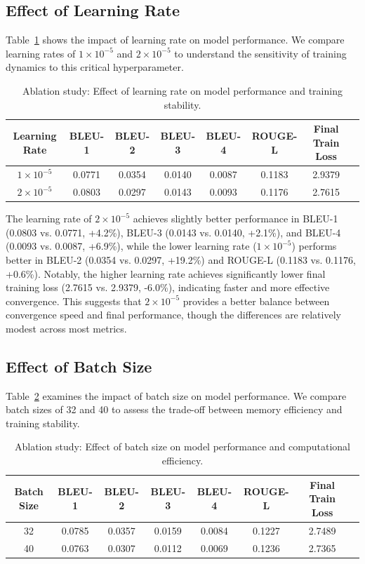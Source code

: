 \documentclass[runningheads]{llncs}
\begin{document}
\subsection{Effect of Learning Rate}

Table~\ref{tab:ablation_lr} shows the impact of learning rate on model performance. We compare learning rates of $1 \times 10^{-5}$ and $2 \times 10^{-5}$ to understand the sensitivity of training dynamics to this critical hyperparameter.

\begin{table}
\caption{Ablation study: Effect of learning rate on model performance and training stability.}\label{tab:ablation_lr}
\begin{tabular}{|c|c|c|c|c|c|c|c|}
\hline
Learning Rate & BLEU-1 & BLEU-2 & BLEU-3 & BLEU-4 & ROUGE-L & Final Train Loss\\
\hline
$1 \times 10^{-5}$ & 0.0771 & 0.0354 & 0.0140 & 0.0087 & 0.1183 & 2.9379\\
$2 \times 10^{-5}$ & 0.0803 & 0.0297 & 0.0143 & 0.0093 & 0.1176 & 2.7615\\
\hline
\end{tabular}
\end{table}

The learning rate of $2 \times 10^{-5}$ achieves slightly better performance in BLEU-1 (0.0803 vs. 0.0771, +4.2\%), BLEU-3 (0.0143 vs. 0.0140, +2.1\%), and BLEU-4 (0.0093 vs. 0.0087, +6.9\%), while the lower learning rate ($1 \times 10^{-5}$) performs better in BLEU-2 (0.0354 vs. 0.0297, +19.2\%) and ROUGE-L (0.1183 vs. 0.1176, +0.6\%). Notably, the higher learning rate achieves significantly lower final training loss (2.7615 vs. 2.9379, -6.0\%), indicating faster and more effective convergence. This suggests that $2 \times 10^{-5}$ provides a better balance between convergence speed and final performance, though the differences are relatively modest across most metrics.

\subsection{Effect of Batch Size}

Table~\ref{tab:ablation_batch} examines the impact of batch size on model performance. We compare batch sizes of 32 and 40 to assess the trade-off between memory efficiency and training stability.

\begin{table}
\caption{Ablation study: Effect of batch size on model performance and computational efficiency.}\label{tab:ablation_batch}
\begin{tabular}{|c|c|c|c|c|c|c|c|}
\hline
Batch Size & BLEU-1 & BLEU-2 & BLEU-3 & BLEU-4 & ROUGE-L & Final Train Loss\\
\hline
32 & 0.0785 & 0.0357 & 0.0159 & 0.0084 & 0.1227 & 2.7489\\
40 & 0.0763 & 0.0307 & 0.0112 & 0.0069 & 0.1236 & 2.7365\\
\hline
\end{tabular}
\end{table}
\end{document}

